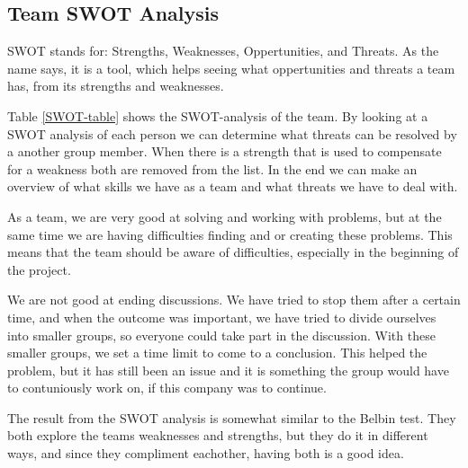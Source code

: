 \subsection{Team SWOT Analysis} 
SWOT stands for: Strengths, Weaknesses, Oppertunities, and Threats. As the name says, it is a tool, which helps seeing what oppertunities and threats a team has, from its strengths and weaknesses. 
 
Table \ref{SWOT-table} shows the SWOT-analysis of the team. 
By looking at a SWOT analysis of each person we can determine what threats can be resolved by a another group member.
When there is a strength that is used to compensate for a weakness both are removed from the list. 
In the end we can make an overview of what skills we have as a team and what threats we have to deal with.

As a team, we are very good at solving and working with problems, but at the same time we are having difficulties finding and or creating these problems. 
This means that the team should be aware of difficulties, especially in the beginning of the project.

We are not good at ending discussions. We have tried to stop them after a certain time, and when the outcome was important, we have tried to divide ourselves into smaller groups, so everyone could take part in the discussion. With these smaller groups, we set a time limit to come to a conclusion. This helped the problem, but it has still been an issue and it is something the group would have to contuniously work on, if this company was to continue. 

The result from the SWOT analysis is somewhat similar to the Belbin test. They both explore the teams weaknesses and strengths, but they do it in different ways, and since they compliment eachother, having both is a good idea.

